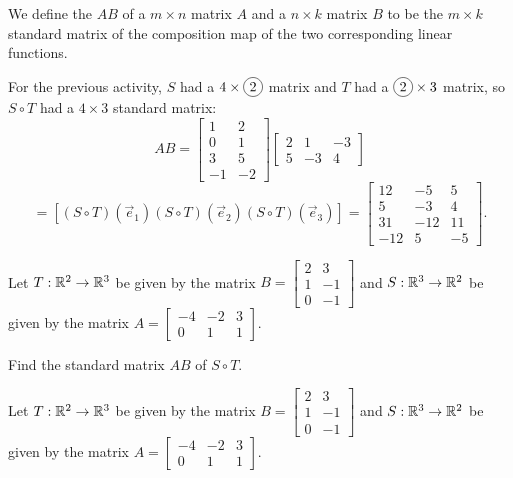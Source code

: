 \begin{applicationActivities}
\begin{definition}
We define the  \(AB\) of a $m \times n$ matrix $A$ and a
$n \times k$
matrix $B$ to be the $m \times k$ standard matrix of the composition map of the
two corresponding linear functions.

\vspace{1em}

For the previous activity, \(S\) had a \(4\times \circledNumber{2}\) matrix and
\(T\) had a \(\circledNumber{2}\times 3\) matrix, so \(S\circ T\) had a
\(4\times 3\) standard matrix:
\[
  AB
    =
  \begin{bmatrix} 1 & 2 \\ 0 & 1 \\ 3 & 5 \\ -1 & -2 \end{bmatrix}
  \begin{bmatrix} 2 & 1 & -3 \\ 5 & -3 & 4 \end{bmatrix}
\]
\[
    =
  \left[
  (S \circ T)(\vec{e}_1) (S\circ T)(\vec{e}_2) (S \circ T)(\vec{e}_3)
  \right]
    =
  \begin{bmatrix}
    12 & -5 & 5 \\
    5 & -3 & 4 \\
    31 & -12 & 11 \\
    -12 & 5 & -5
  \end{bmatrix}
.\]
\end{definition}



\begin{activity}{10}
Let $T: \mathbb{R}^2 \rightarrow \mathbb{R}^3$ be given by the matrix $B=\begin{bmatrix} 2 & 3 \\ 1 & -1 \\ 0 & -1 \end{bmatrix}$ and $S: \mathbb{R}^3 \rightarrow \mathbb{R}^2$ be given by the matrix $A=\begin{bmatrix} -4 & -2 & 3 \\ 0 & 1 & 1 \end{bmatrix}$.

Find the standard matrix \(AB\) of $S \circ T$.
\end{activity}

\begin{activity}{5}
Let $T: \mathbb{R}^2 \rightarrow \mathbb{R}^3$ be given by the matrix $B=\begin{bmatrix} 2 & 3 \\ 1 & -1 \\ 0 & -1 \end{bmatrix}$ and $S: \mathbb{R}^3 \rightarrow \mathbb{R}^2$ be given by the matrix $A=\begin{bmatrix} -4 & -2 & 3 \\ 0 & 1 & 1 \end{bmatrix}$.


\end{activity}
\end{applicationActivities}
